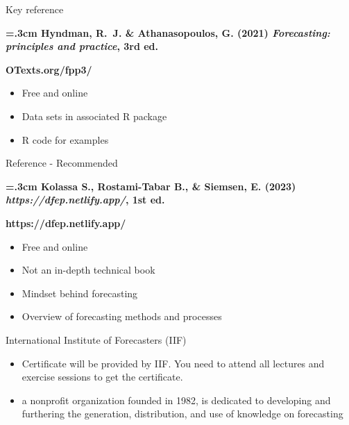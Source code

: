 \documentclass[
  14pt,
  ignorenonframetext,
  aspectratio=169,
]{beamer}
\providecommand{\tightlist}{%
  \setlength{\itemsep}{0pt}\setlength{\parskip}{0pt}}\usepackage{longtable,booktabs,array}
\begin{document}
\begin{frame}{Key reference}
\protect\hypertarget{key-reference}{}
\large

\begin{block}{}\bf
{}\hangindent=.3cm
 {Hyndman, R.~J. \& Athanasopoulos, G. (2021) \emph{Forecasting: principles and practice}, 3rd ed.}
\end{block}\pause
\begin{alertblock}{}\Large
\centerline{\bf OTexts.org/fpp3/}
\end{alertblock}

\pause

\begin{itemize}
\tightlist
\item
  Free and online
\item
  Data sets in associated R package
\item
  R code for examples
\end{itemize}
\end{frame}

\begin{frame}{Reference - Recommended}
\protect\hypertarget{reference---recommended}{}
\large

\begin{block}{}\bf
{}\hangindent=.3cm
 {Kolassa S., Rostami-Tabar B., \& Siemsen, E. (2023) \emph{https://dfep.netlify.app/}, 1st ed.}
\end{block}\pause
\begin{alertblock}{}\Large
\centerline{\bf https://dfep.netlify.app/}
\end{alertblock}

\pause
\fontsize{11}{11}\sf

\begin{itemize}
\tightlist
\item
  Free and online
\item
  Not an in-depth technical book
\item
  Mindset behind forecasting
\item
  Overview of forecasting methods and processes
\end{itemize}
\end{frame}

\begin{frame}{International Institute of Forecasters (IIF)}
\protect\hypertarget{international-institute-of-forecasters-iif}{}
\begin{itemize}
\item
  Certificate will be provided by IIF. You need to attend all lectures
  and exercise sessions to get the certificate.
\item
  a nonprofit organization founded in 1982, is dedicated to developing
  and furthering the generation, distribution, and use of knowledge on
  forecasting
\end{itemize}
\end{frame}
\end{document}
